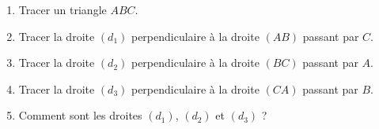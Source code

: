 \begin{exercice*}
   \begin{enumerate}
      \item Tracer un triangle $ABC$.
      \item Tracer la droite $(d_1)$ perpendiculaire à la droite $(AB)$ passant par $C$.
      \item Tracer la droite $(d_2)$ perpendiculaire à la droite $(BC)$ passant par $A$.
      \item Tracer la droite $(d_3)$ perpendiculaire à la droite $(CA)$ passant par $B$.
      \item Comment sont les droites $(d_1)$, $(d_2)$ et $(d_3)$ ?
   \end{enumerate}
\end{exercice*}
 